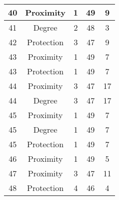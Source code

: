 \documentclass[results.tex]{subfiles}
\begin{document}
\begin{center}
\begin{tabular}{| c || c | c | c | c |}
            \hline
            40                      & Proximity                    & 1                      & 49                      & 9                    \\
            \hline
            41                      & Degree                       & 2                      & 48                      & 3                    \\
            \hline
            42                      & Protection                   & 3                      & 47                      & 9                    \\
            \hline
            43                      & Proximity                    & 1                      & 49                      & 7                    \\
            \hline
            43                      & Protection                   & 1                      & 49                      & 7                    \\
            \hline
            44                      & Proximity                    & 3                      & 47                      & 17                   \\
            \hline
            44                      & Degree                       & 3                      & 47                      & 17                   \\
            \hline
            45                      & Proximity                    & 1                      & 49                      & 7                    \\
            \hline
            45                      & Degree                       & 1                      & 49                      & 7                    \\
            \hline
            45                      & Protection                   & 1                      & 49                      & 7                    \\
            \hline
            46                      & Proximity                    & 1                      & 49                      & 5                    \\
            \hline
            47                      & Proximity                    & 3                      & 47                      & 11                   \\
            \hline
            48                      & Protection                   & 4                      & 46                      & 4                    \\

\end{tabular}
\end{center}
\end{document}
